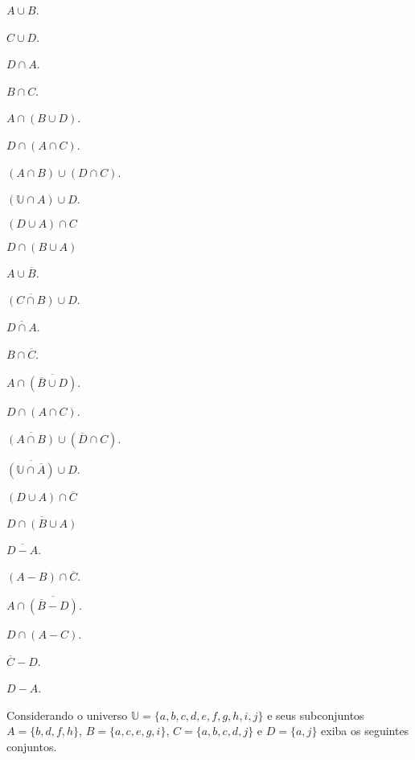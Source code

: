 \begin{exerList}
	\item $A \cup B$.
	\item $C \cup D$.
	\item $D \cap A$.
	\item $B \cap C$.
	\item $A \cap (B \cup D)$.
	\item $D \cap (A \cap C)$.
	\item $(A \cap B) \cup (D \cap C)$.
	\item $(\mathbb{U} \cap A) \cup D$.
	\item $(D \cup A) \cap C$
	\item $D \cap (B \cup A)$
	\item $A \cup \overline{B}$.
	\item $\overline{(C \cap B)} \cup D$.
	\item $\overline{D \cap A}$.
	\item $B \cap \overline{C}$.
	\item $A \cap \overline{(\overline{B} \cup D)}$.
	\item $D \cap (A \cap C)$.
	\item $\overline{(A \cap B)} \cup (\overline{D} \cap C)$.
	\item $\overline{(\mathbb{U} \cap \overline{A})} \cup D$.
	\item $(D \cup A) \cap \overline{C}$
	\item $\overline{D \cap (B \cup A)}$
	\item $\overline{D - A}$.
	\item $(A - B) \cap \overline{C}$.
	\item $A \cap \overline{(\overline{B} - D)}$.
	\item $D \cap (A - C)$.
	\item $\overline{C} - D$.
	\item $D - A$.
\end{exerList}

\begin{questao}\label{test:Conjuntos10}
	Considerando o universo $\mathbb{U} = \{a, b, c, d, e, f, g, h, i, j\}$ e seus subconjuntos $A = \{b, d, f, h\}$, $B = \{a, c, e, g, i\}$, $C = \{a, b, c, d, j\}$ e $D = \{a, j\}$ exiba os seguintes conjuntos.
\end{questao}

